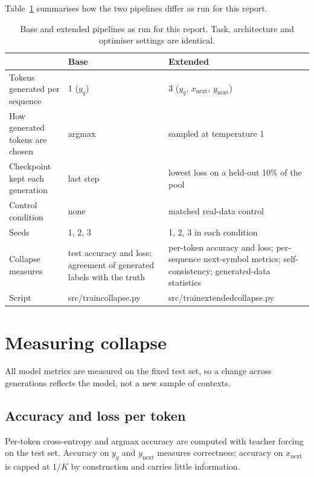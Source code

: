 \documentclass[11pt,a4paper]{article}
\newcommand{\xnext}{x_{\mathrm{next}}}
\newcommand{\ynext}{y_{\mathrm{next}}}
\newcommand{\yq}{y_{q}}
\DeclareRobustCommand{\code}[1]{\begingroup\ttfamily\def\_{\textunderscore\allowbreak}#1\endgroup}
\begin{document}
Table~\ref{tab:pipelines} summarises how the two pipelines differ as run for
this report.

\begin{table}[htbp]
\centering
\small
\caption{Base and extended pipelines as run for this report. Task,
architecture and optimiser settings are identical.}
\label{tab:pipelines}
\begin{tabularx}{\linewidth}{lXX}
\toprule
 & Base & Extended\\
\midrule
Tokens generated per sequence & 1 ($\yq$) & 3 ($\yq$, $\xnext$, $\ynext$)\\
How generated tokens are chosen & argmax & sampled at temperature 1\\
Checkpoint kept each generation & last step & lowest loss on a held-out 10\% of the pool\\
Control condition & none & matched real-data control\\
Seeds & 1, 2, 3 & 1, 2, 3 in each condition\\
Collapse measures & test accuracy and loss; agreement of generated labels with the truth & per-token accuracy and loss; per-sequence next-symbol metrics; self-consistency; generated-data statistics\\
Script & \code{src/train\_collapse.py} & \code{src/train\_extended\_collapse.py}\\
\bottomrule
\end{tabularx}
\end{table}

\section{Measuring collapse}\label{sec:metrics}

All model metrics are measured on the fixed test set, so a change across
generations reflects the model, not a new sample of contexts.

\subsection{Accuracy and loss per token}
Per-token cross-entropy and argmax accuracy are computed with teacher forcing
on the test set. Accuracy on $\yq$ and $\ynext$ measures correctness; accuracy
on $\xnext$ is capped at $1/K$ by construction and carries little
information.
\end{document}
